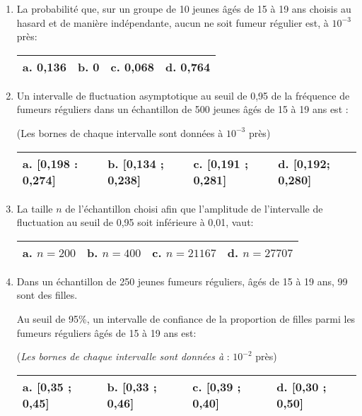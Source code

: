 \begin{enumerate}
     \item
     La probabilité que, sur un groupe de 10 jeunes âgés de 15 à 19 ans choisis au hasard et de manière indépendante, aucun ne soit fumeur régulier est, à $10^{-3}$ près:
     \begin{tabularx}{0.8\linewidth}{|*{3}{>{\centering \arraybackslash }X|}}%
          \hline
          \textbf{a}.   0,136 & \textbf{b}.   0 & \textbf{c}.   0,068 & \textbf{d}.   0,764
          \\ \hline
     \end{tabularx}
     \item
     Un intervalle de fluctuation asymptotique au seuil de 0,95 de la fréquence de fumeurs réguliers dans un échantillon de 500 jeunes âgés de 15 à 19 ans est :
     \par
     (Les bornes de chaque intervalle sont données à $10^{-3}$ près)
     \begin{tabularx}{0.8\linewidth}{|*{3}{>{\centering \arraybackslash }X|}}%
          \hline
          \textbf{a}.    [0,198 : 0,274]  & \textbf{b}.  [0,134 ; 0,238] & \textbf{c}.   [0,191 ; 0,281] & \textbf{d}.   [0,192; 0,280]
          \\ \hline
     \end{tabularx}
     \item
     La taille $n$ de l'échantillon choisi afin que l'amplitude de l'intervalle de fluctuation au seuil de 0,95 soit inférieure à 0,01, vaut:
     \begin{tabularx}{0.8\linewidth}{|*{3}{>{\centering \arraybackslash }X|}}%
          \hline
          \textbf{a}.  $n=200$ & \textbf{b}.  $n=400$ & \textbf{c}.   $n=21167$ & \textbf{d}.   $n=27707$
          \\ \hline
     \end{tabularx}
     \item
     Dans un échantillon de 250 jeunes fumeurs réguliers, âgés de 15 à 19 ans, 99 sont des filles.
     \par
     Au seuil de 95\%, un intervalle de confiance de la proportion de filles parmi les fumeurs réguliers âgés de 15 à 19 ans est:
     \par
     (\textit{Les bornes de chaque intervalle sont données à }: $10^{- 2}$ près)
     \begin{tabularx}{0.8\linewidth}{|*{3}{>{\centering \arraybackslash }X|}}%
          \hline
          \textbf{a}.  [0,35 ; 0,45] & \textbf{b}.   [0,33 ; 0,46] &  \textbf{c}.   [0,39 ; 0,40] &  \textbf{d}.   [0,30 ; 0,50]
          \\ \hline
\end{tabularx}\end{enumerate}
\begin{corrige}
     <div>
     Solution rédigée par Abbertrand
     \par
     [pdf-embedder url="/wp-content/uploads/slides/qcm-bac-es-liban-2014/qcm-bac-es-liban-2014.pdf" width="676"]
}
}\end{corrige}
